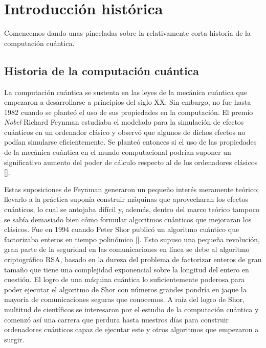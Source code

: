 \chapter{Introducción histórica}

Comencemos dando unas pinceladas sobre la relativamente corta historia de la computación cuántica.

\section{Historia de la computación cuántica}
\label{sec:sec11}

La computación cuántica se sustenta en las leyes de la mecánica cuántica que empezaron a desarrollarse a principios del siglo XX. Sin embargo, no fue hasta 1982 cuando se planteó el uso de sus propiedades en la computación. El premio \textit{Nobel} Richard Feynman estudiaba el modelado para la simulación de efectos cuánticos en un ordenador clásico y observó que algunos de dichos efectos no podían simularse eficientemente. Se planteó entonces si el uso de las propiedades de la mecánica cuántica en el mundo computacional podrían suponer un significativo aumento del poder de cálculo respecto al de los ordenadores clásicos [\cite{feynman1982modeling}].

Estas suposiciones de Feynman generaron un pequeño interés meramente teórico; llevarlo a la práctica suponía construir máquinas que aprovecharan los efectos cuánticos, lo cual se antojaba difícil y, además, dentro del marco teórico tampoco se sabía demasiado bien cómo formular algoritmos cuánticos que mejoraran los clásicos. Fue en 1994 cuando Peter Shor publicó un algoritmo cuántico que factorizaba enteros en tiempo polinómico [\cite{shor1994algorithms}]. Esto supuso una pequeña revolución, gran parte de la seguridad en las comunicaciones en línea se debe al algoritmo criptográfico RSA, basado en la dureza del problema de factorizar enteros de gran tamaño que tiene una complejidad exponencial sobre la longitud del entero en cuestión. El logro de una máquina cuántica lo suficientemente poderosa para poder ejecutar el algoritmo de Shor con números grandes pondría en jaque la mayoría de comunicaciones seguras que conocemos. A raíz del logro de Shor, multitud de científicos se interesaron por el estudio de la computación cuántica y comenzó así una carrera que perdura hasta nuestros días para construir ordenadores cuánticos capaz de ejecutar este y otros algoritmos que empezaron a surgir.

